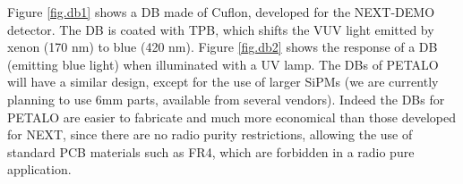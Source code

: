 Figure \ref{fig.db1} shows a DB made of Cuflon, developed for the NEXT-DEMO detector. The DB is coated with TPB, which shifts the VUV light emitted by xenon (170 nm) to blue (420 nm). Figure \ref{fig.db2} shows the response of a DB (emitting blue light) when illuminated with a UV lamp. The DBs of PETALO will have a similar design, except for the use of larger SiPMs (we are currently planning to use 6mm parts, available from several vendors).
Indeed the DBs for PETALO are easier to fabricate and much more economical than those developed for NEXT, since there are no radio purity restrictions, allowing the use of standard PCB materials such as FR4, which are forbidden in a radio pure application.

